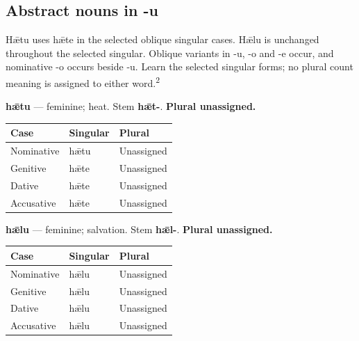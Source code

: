 \subsection*{Abstract nouns in -u}

Hǣtu uses hǣte in the selected oblique singular cases. Hǣlu is unchanged throughout the selected singular. Oblique variants in -u, -o and -e occur, and nominative -o occurs beside -u. Learn the selected singular forms; no plural count meaning is assigned to either word.\textsuperscript{2}

\textbf{hǣtu} — feminine; heat. Stem \textbf{hǣt-}. \textbf{Plural unassigned.}

\par\begingroup
\fontsize{10.5}{13.2}\selectfont
\setlength{\LTleft}{0pt}\setlength{\LTright}{\fill}
\noindent
\begin{tabular}{@{}>{\raggedright\arraybackslash}p{39.46mm}>{\raggedright\arraybackslash}p{39.46mm}>{\raggedright\arraybackslash}p{39.46mm}@{}}
\toprule
\textbf{Case} & \textbf{Singular} & \textbf{Plural} \\
\midrule
Nominative & hǣtu & Unassigned \\
Genitive & hǣte & Unassigned \\
Dative & hǣte & Unassigned \\
Accusative & hǣte & Unassigned \\
\bottomrule
\end{tabular}
\par\endgroup

\textbf{hǣlu} — feminine; salvation. Stem \textbf{hǣl-}. \textbf{Plural unassigned.}

\par\begingroup
\fontsize{10.5}{13.2}\selectfont
\setlength{\LTleft}{0pt}\setlength{\LTright}{\fill}
\noindent
\begin{tabular}{@{}>{\raggedright\arraybackslash}p{39.46mm}>{\raggedright\arraybackslash}p{39.46mm}>{\raggedright\arraybackslash}p{39.46mm}@{}}
\toprule
\textbf{Case} & \textbf{Singular} & \textbf{Plural} \\
\midrule
Nominative & hǣlu & Unassigned \\
Genitive & hǣlu & Unassigned \\
Dative & hǣlu & Unassigned \\
Accusative & hǣlu & Unassigned \\
\bottomrule
\end{tabular}
\par\endgroup

